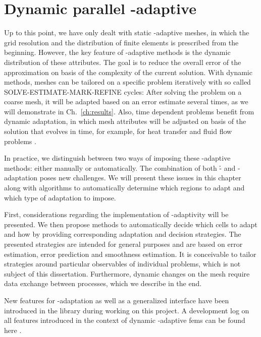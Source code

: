 \chapter{Dynamic parallel \hp-adaptive }
\label{ch:dynamic}
\glsresetall

Up to this point, we have only dealt with static \hp-adaptive meshes, in which the grid resolution and the distribution of finite elements is prescribed from the beginning. %
However, the key feature of \hp-adaptive methods is the dynamic distribution of these attributes. The goal is to reduce the overall error of the approximation on basis of the complexity of the current solution. With dynamic methods, meshes can be tailored on a specific problem iteratively with so called SOLVE-ESTIMATE-MARK-REFINE cycles: After solving the problem on a coarse mesh, it will be adapted based on an error estimate several times, as we will demonstrate in Ch.~\ref{ch:results}. Also, time dependent problems benefit from dynamic adaptation, in which mesh attributes will be adjusted on basis of the solution that evolves in time, for example, for heat transfer \textcite{dealiistep-26} and fluid flow problems \textcite{dealiistep-31}.

In practice, we distinguish between two ways of imposing these \hp-adaptive methods: either manually or automatically. The combination of both \h- and \p-adaptation poses new challenges. We will present these issues in this chapter along with algorithms to automatically determine which regions to adapt and which type of adaptation to impose.

First, considerations regarding the implementation of \hp-adaptivity will be presented. We then propose methods to automatically decide which cells to adapt and how by providing corresponding adaptation and decision strategies. The presented strategies are intended for general purposes and are based on error estimation, error prediction and smoothness estimation. It is conceivable to tailor strategies around particular observables of individual problems, which is not subject of this dissertation. Furthermore, dynamic changes on the mesh require data exchange between processes, which we describe in the end.

New features for \hp-adaptation as well as a generalized interface have been introduced in the \dealii{} library \textcite{dealii920pre} during working on this project. A development log on all features introduced in the context of dynamic \hp-adaptive \glspl{fem} can be found here \cite{dealiiissue7515}.





